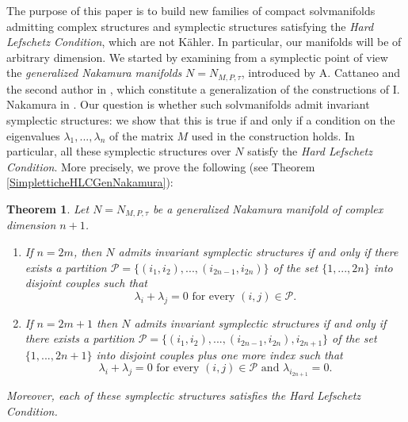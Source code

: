\documentclass[a4paper, 11pt]{amsart}
\theoremstyle{plain}
\newtheorem{teorema}{Theorem} [section]
\theoremstyle{definition}
\numberwithin{equation}{section}
\begin{document}
{The purpose of this paper is to build new families of compact solvmanifolds admitting complex structures and symplectic structures satisfying the \textit{Hard Lefschetz Condition}, which are not K\"ahler. In particular, our manifolds will be of arbitrary dimension.
We started by examining from a symplectic point of view the \textit{generalized Nakamura manifolds} $N = N_{M,P,\tau}$, introduced by A. Cattaneo and the second author in \cite{CT}, which constitute a generalization of the constructions of I. Nakamura in \cite{N}. Our question is whether such solvmanifolds admit invariant symplectic structures: we show that this is true if and only if a condition on the eigenvalues $\lambda_{1}, ..., \lambda_{n}$ of the matrix $M$ used in the construction holds. In particular, all these symplectic structures over $N$ satisfy the \textit{Hard Lefschetz Condition}. More precisely, we prove the following (see Theorem \ref{SimpletticheHLCGenNakamura}):
\begin{teorema}\label{MainThm1}
    \setlength\itemsep{1em}
    Let $N = N_{M, P, \tau}$ be a generalized Nakamura manifold of complex dimension $n + 1$. 
    \begin{enumerate}
   \item If $n = 2m$, then $N$ admits invariant symplectic structures if and only if there exists a partition $\mathcal{P} = \{(i_1, i_2), ..., (i_{2n-1}, i_{2n})\}$ of the set $\{1, ..., 2n\}$ into disjoint couples such that 
   \[\lambda_i + \lambda_j = 0 \text{ for every } (i, j) \in \mathcal{P}.\]
    \item If $n = 2m+1$ then $N$ admits invariant symplectic structures if and only if there exists a partition $\mathcal{P} = \{(i_1, i_2), ..., (i_{2n-1}, i_{2n}), i_{2n+1}\}$ of the set $\{1, ..., 2n+1\}$ into disjoint couples plus one more index such that 
    \[\lambda_i + \lambda_j = 0 \text{ for every } (i, j) \in \mathcal{P} \text{ and } \lambda_{i_{2n+1}} = 0.\]
    \end{enumerate}
    Moreover, each of these symplectic structures satisfies the Hard Lefschetz Condition.
\end{teorema}
}
\end{document}
